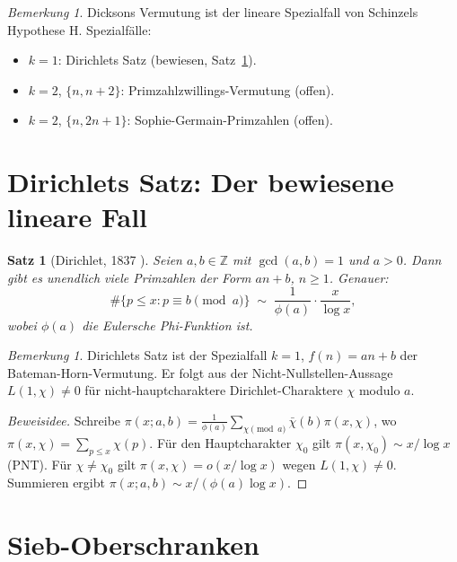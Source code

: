 \documentclass[12pt,a4paper]{amsart}
\newtheorem{satz}[theorem]{Satz}
\theoremstyle{definition}
\theoremstyle{remark}
\newtheorem{bemerkung}[theorem]{Bemerkung}
\newcommand{\Z}{\mathbb{Z}}
\begin{document}
\begin{bemerkung}
  Dicksons Vermutung ist der lineare Spezialfall von Schinzels Hypothese H.
  Spezialfälle:
  \begin{itemize}
    \item $k=1$: Dirichlets Satz (bewiesen, Satz~\ref{satz:dirichlet}).
    \item $k=2$, $\{n, n+2\}$: Primzahlzwillings-Vermutung (offen).
    \item $k=2$, $\{n, 2n+1\}$: Sophie-Germain-Primzahlen (offen).
  \end{itemize}
\end{bemerkung}

\section{Dirichlets Satz: Der bewiesene lineare Fall}\label{sec:dirichlet}

\begin{satz}[Dirichlet, 1837 \cite{Dirichlet1837}]\label{satz:dirichlet}
  Seien $a, b \in \Z$ mit $\gcd(a,b) = 1$ und $a > 0$. Dann gibt es unendlich viele
  Primzahlen der Form $an+b$, $n \geq 1$. Genauer:
  \[
    \#\{p \leq x : p \equiv b \pmod{a}\} \;\sim\; \frac{1}{\phi(a)} \cdot \frac{x}{\log x},
  \]
  wobei $\phi(a)$ die Eulersche Phi-Funktion ist.
\end{satz}

\begin{bemerkung}
  Dirichlets Satz ist der Spezialfall $k=1$, $f(n) = an+b$ der Bateman-Horn-Vermutung.
  Er folgt aus der Nicht-Nullstellen-Aussage $L(1,\chi) \neq 0$ für nicht-hauptcharaktere
  Dirichlet-Charaktere $\chi$ modulo $a$.
\end{bemerkung}

\begin{proof}[Beweisidee]
  Schreibe $\pi(x;a,b) = \frac{1}{\phi(a)} \sum_{\chi \pmod{a}} \bar{\chi}(b) \pi(x,\chi)$,
  wo $\pi(x,\chi) = \sum_{p \leq x} \chi(p)$.
  Für den Hauptcharakter $\chi_0$ gilt $\pi(x,\chi_0) \sim x/\log x$ (PNT).
  Für $\chi \neq \chi_0$ gilt $\pi(x,\chi) = o(x/\log x)$ wegen $L(1,\chi) \neq 0$.
  Summieren ergibt $\pi(x;a,b) \sim x / (\phi(a) \log x)$.
\end{proof}

\section{Sieb-Oberschranken}\label{sec:sieb}
\end{document}
